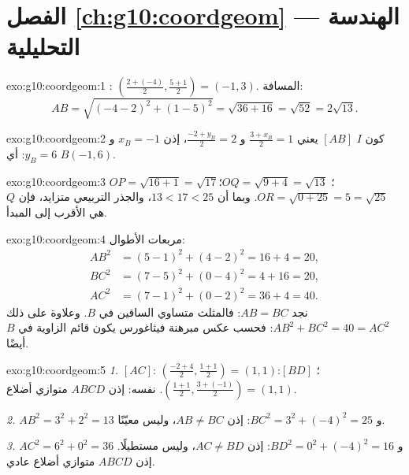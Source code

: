 \section*{الفصل \ref{ch:g10:coordgeom} --- الهندسة التحليلية}

\begin{solution}{exo:g10:coordgeom:1}
: $\left(\frac{2 + (-4)}{2}, \frac{5 + 1}{2}\right) = (-1, 3)$.
المسافة:
\[
AB = \sqrt{(-4 - 2)^2 + (1 - 5)^2} = \sqrt{36 + 16} = \sqrt{52}
= 2\sqrt{13}.
\]
\end{solution}

\begin{solution}{exo:g10:coordgeom:2}
كون $I$  $[AB]$ يعني $\frac{3 + x_B}{2} = 1$ و
$\frac{-2 + y_B}{2} = 2$، إذن $x_B = -1$ و $y_B = 6$: أي $B(-1, 6)$.
\end{solution}

\begin{solution}{exo:g10:coordgeom:3}
$OP = \sqrt{16 + 1} = \sqrt{17}$؛ $OQ = \sqrt{9 + 4} = \sqrt{13}$؛
$OR = \sqrt{0 + 25} = 5 = \sqrt{25}$. وبما أن $13 < 17 < 25$، والجذر
التربيعي متزايد، فإن $Q$ هي الأقرب إلى المبدأ.
\end{solution}

\begin{solution}{exo:g10:coordgeom:4}
مربعات الأطوال:
\begin{align*}
AB^2 &= (5-1)^2 + (4-2)^2 = 16 + 4 = 20, \\
BC^2 &= (7-5)^2 + (0-4)^2 = 4 + 16 = 20, \\
AC^2 &= (7-1)^2 + (0-2)^2 = 36 + 4 = 40 .
\end{align*}
نجد $AB = BC$: فالمثلث متساوي الساقين في $B$. وعلاوة على ذلك
$AB^2 + BC^2 = 40 = AC^2$: فحسب عكس مبرهنة فيثاغورس يكون
قائم الزاوية في $B$ أيضًا.
\end{solution}

\begin{solution}{exo:g10:coordgeom:5}
\emph{1.}  $[AC]$:
$\left(\frac{-2+4}{2}, \frac{1+1}{2}\right) = (1, 1)$؛ 
$[BD]$: $\left(\frac{1+1}{2}, \frac{3+(-1)}{2}\right) = (1, 1)$. 
نفسه: إذن $ABCD$ متوازي أضلاع.

\emph{2.} $AB^2 = 3^2 + 2^2 = 13$ و $BC^2 = 3^2 + (-4)^2 = 25$:
إذن $AB \neq BC$، وليس معيّنًا.

\emph{3.} $AC^2 = 6^2 + 0^2 = 36$ و $BD^2 = 0^2 + (-4)^2 = 16$:
إذن $AC \neq BD$، وليس مستطيلًا. إذن $ABCD$ متوازي أضلاع عادي.
\end{solution}

